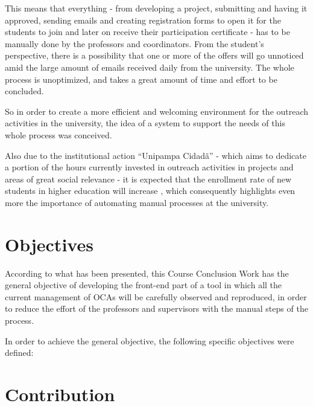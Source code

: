 This means that everything - from developing a project, submitting and having it approved, sending emails and creating registration forms to open it for the students to join and later on receive their participation certificate - has to be manually done by the professors and coordinators. From the student's perspective, there is a possibility that one or more of the offers will go unnoticed amid the large amount of emails received daily from the university. The whole process is unoptimized, and takes a great amount of time and effort to be concluded.

So in order to create a more efficient and welcoming environment for the outreach activities in the university, the idea of a system to support the needs of this whole process was conceived. 

Also due to the institutional action ``Unipampa Cidadã'' - which aims to dedicate a portion of the hours currently invested in outreach activities in projects and areas of great social relevance - it is expected that the enrollment rate of new students in higher education will increase \cite{unipampacidada}, which consequently highlights even more the importance of automating manual processes at the university.

\section{Objectives}\label{sec:objectives}

According to what has been presented, this Course Conclusion Work has the general objective of developing the front-end part of a tool in which all the current management of \acp{OCA} will be carefully observed and reproduced, in order to reduce the effort of the professors and supervisors with the manual steps of the process. 

In order to achieve the general objective, the following specific objectives were defined:

\section{Contribution}\label{sec:contribution}


